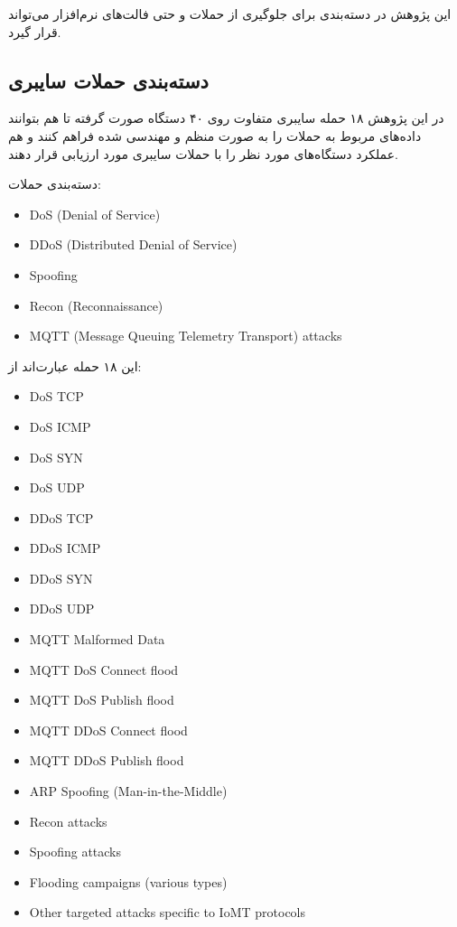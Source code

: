 این پژوهش در دسته‌بندی  برای جلوگیری از حملات و حتی
فالت‌های نرم‌افزار می‌تواند قرار گیرد.

\subsection{دسته‌بندی حملات سایبری}

در این پژوهش ۱۸ حمله سایبری متفاوت روی ۴۰ دستگاه  صورت گرفته تا هم
بتوانند داده‌های مربوط به حملات را به صورت منظم و مهندسی شده فراهم کنند و هم
عملکرد دستگاه‌های  مورد نظر را با حملات سایبری مورد ارزیابی قرار دهند.

دسته‌بندی حملات:

\begin{LTR}
    \begin{itemize}
        \item DoS (Denial of Service)
        \item DDoS (Distributed Denial of Service)
        \item Spoofing
        \item Recon (Reconnaissance)
        \item MQTT (Message Queuing Telemetry Transport) attacks
    \end{itemize}
\end{LTR}

این ۱۸ حمله عبارت‌اند از:

\begin{LTR}
    \begin{itemize}
       \item DoS TCP
       \item DoS ICMP
       \item DoS SYN
       \item DoS UDP
       \item DDoS TCP
       \item DDoS ICMP
       \item DDoS SYN
       \item DDoS UDP
       \item MQTT Malformed Data
       \item MQTT DoS Connect flood
       \item MQTT DoS Publish flood
       \item MQTT DDoS Connect flood
       \item MQTT DDoS Publish flood
       \item ARP Spoofing (Man-in-the-Middle)
       \item Recon attacks
       \item Spoofing attacks
       \item Flooding campaigns (various types)
       \item Other targeted attacks specific to IoMT protocols
    \end{itemize}
\end{LTR}

